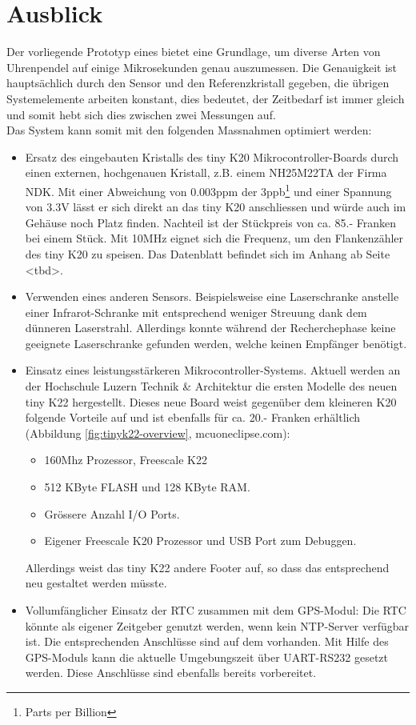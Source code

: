 \section{Ausblick}
Der vorliegende Prototyp eines \documenttitle bietet eine Grundlage, um diverse Arten von Uhrenpendel auf einige Mikrosekunden genau auszumessen. Die Genauigkeit ist hauptsächlich durch den Sensor und den Referenzkristall gegeben, die übrigen Systemelemente arbeiten konstant, dies bedeutet, der Zeitbedarf ist immer gleich und somit hebt sich dies zwischen zwei Messungen auf.\\
Das System kann somit mit den folgenden Massnahmen optimiert werden:
\begin{itemize}
	\item Ersatz des eingebauten Kristalls des tiny K20 Mikrocontroller-Boards durch einen externen, hochgenauen Kristall, z.B. einem NH25M22TA der Firma NDK. Mit einer Abweichung von 0.003ppm der 3ppb\footnote{Parts per Billion} und einer Spannung von 3.3V lässt er sich direkt an das tiny K20 anschliessen und würde auch im Gehäuse noch Platz finden. Nachteil ist der Stückpreis von ca. 85.- Franken bei einem Stück. Mit 10MHz eignet sich die Frequenz, um den Flankenzähler des tiny K20 zu speisen. Das Datenblatt befindet sich im Anhang ab Seite <tbd>.
	\item Verwenden eines anderen Sensors. Beispielsweise eine Laserschranke anstelle einer Infrarot-Schranke mit entsprechend weniger Streuung dank dem dünneren Laserstrahl. Allerdings konnte während der Recherchephase keine geeignete Laserschranke gefunden werden, welche keinen Empfänger benötigt.
	\item Einsatz eines leistungsstärkeren Mikrocontroller-Systems. Aktuell werden an der Hochschule Luzern Technik \& Architektur die ersten Modelle des neuen tiny K22 hergestellt. Dieses neue Board weist gegenüber dem kleineren K20 folgende Vorteile auf und ist ebenfalls für ca. 20.- Franken erhältlich (Abbildung \ref{fig:tinyk22-overview}, mcuoneclipse.com):
	\begin{itemize}
		\item 160Mhz Prozessor, Freescale K22
		\item 512 KByte FLASH und 128 KByte RAM.
		\item Grössere Anzahl I/O Ports.
		\item Eigener Freescale K20 Prozessor und USB Port zum Debuggen. 
	\end{itemize}
	Allerdings weist das tiny K22 andere Footer auf, so dass das \hwb entsprechend neu gestaltet werden müsste.
	\item Vollumfänglicher Einsatz der RTC zusammen mit dem GPS-Modul: Die RTC könnte als eigener Zeitgeber genutzt werden, wenn kein NTP-Server verfügbar ist. Die entsprechenden \iic Anschlüsse sind auf dem \hwb vorhanden. Mit Hilfe des GPS-Moduls kann die aktuelle Umgebungszeit über UART-RS232 gesetzt werden. Diese Anschlüsse sind ebenfalls bereits vorbereitet.  
\end{itemize}
